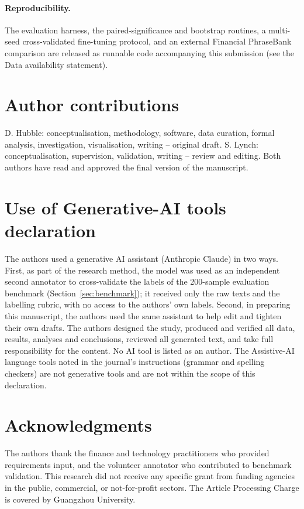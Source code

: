\documentclass{aims}
\numberwithin{equation}{section}
\begin{document}
\paragraph{Reproducibility.}\label{sec:reprod}
The evaluation harness, the paired-significance and bootstrap routines, a multi-seed
cross-validated fine-tuning protocol, and an external Financial PhraseBank
comparison are released as runnable code accompanying this submission (see the Data
availability statement).

\section*{Author contributions}
D. Hubble: conceptualisation, methodology, software, data curation, formal analysis,
investigation, visualisation, writing -- original draft. S. Lynch: conceptualisation,
supervision, validation, writing -- review and editing. Both authors have read and
approved the final version of the manuscript.

\section*{Use of Generative-AI tools declaration}
The authors used a generative AI assistant (Anthropic Claude) in two ways. First,
as part of the research method, the model was used as an independent second
annotator to cross-validate the labels of the 200-sample evaluation benchmark
(Section~\ref{sec:benchmark}); it received only the raw texts and the labelling
rubric, with no access to the authors' own labels. Second, in preparing this
manuscript, the authors used the same assistant to help edit and tighten their own
drafts. The authors designed the study, produced and verified all data, results,
analyses and conclusions, reviewed all generated text, and take full
responsibility for the content. No AI tool is listed as an author. The Assistive-AI
language tools noted in the journal's instructions (grammar and spelling checkers)
are not generative tools and are not within the scope of this declaration.

\section*{Acknowledgments}
The authors thank the finance and technology practitioners who provided
requirements input, and the volunteer annotator who contributed to benchmark
validation. This research did not receive any specific grant
from funding agencies in the public, commercial, or not-for-profit sectors. The
Article Processing Charge is covered by Guangzhou University.
\end{document}
